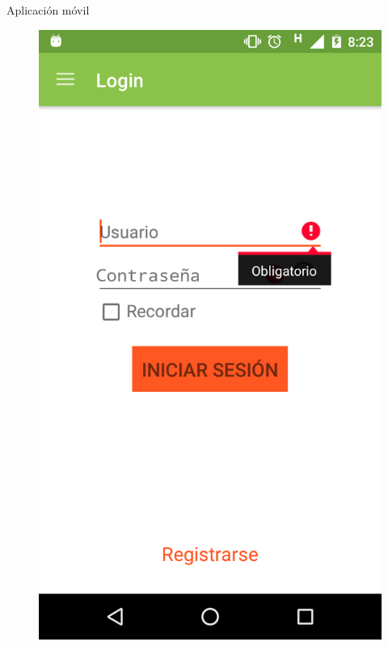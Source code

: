 \documentclass[10pt,xcolor=svgnames]{beamer}
\begin{document}
\begin{frame}{Aplicación móvil}
\begin{minipage}{\linewidth}
    \begin{minipage}{0.4\linewidth}
      \begin{figure}[H]
        \includegraphics[width=\linewidth]{img/captura_13}
      \end{figure}
    \end{minipage}
  \end{minipage}
\end{frame}
\end{document}
